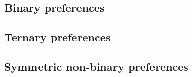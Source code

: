 \subsection{Binary preferences}


\subsection{Ternary preferences}
\label{sec:threed_efr_as_jef_ternary}


\subsection{Symmetric non-binary preferences}
\label{sec:threed_efr_as_jef_symmetricnonbinrary}
